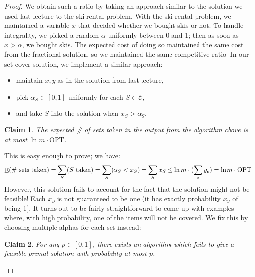 \documentclass[11pt]{article}
\DeclareMathOperator*{\E}{\mathbb{E}}
\let\Pr\relax
\DeclareMathOperator*{\Pr}{\mathbb{P}}
\newtheorem{claim}{Claim}[theorem]
\newcommand{\C}{\mathcal{C}}
\begin{document}
\begin{proof} We obtain such a ratio by taking an approach similar to the solution we used last lecture to the ski rental problem.  With the ski rental problem, we maintained a variable $x$ that decided whether we bought skis or not.  To handle integrality, we picked a random $\alpha$ uniformly between 0 and 1; then as soon as $x > \alpha$, we bought skis.  The expected cost of doing so maintained the same cost from the fractional solution, so we maintained the same competitive ratio.  In our set cover solution, we implement a similar approach:
\begin{itemize}
\setlength\itemsep{0cm}
\item maintain $x, y$ as in the solution from last lecture,
\item pick $\alpha_S \in [0, 1]$ uniformly for each $S \in \C$,
\item and take $S$ into the solution when $x_S > \alpha_S$.
\end{itemize}

\begin{framed}\begin{claim}
The expected \# of sets taken in the output from the algorithm above is at most $\ln m \cdot \text{OPT}$.
\end{claim}\end{framed}

This is easy enough to prove; we have:
$$\E(\# \text{ sets taken}) 
= \sum_S \Pr(S \text{ taken}) 
= \sum_S \Pr(\alpha_S < x_S) 
= \sum_S x_S \le \ln m \cdot (\sum_e y_e) 
= \ln m \cdot \text{OPT}$$
However, this solution fails to account for the fact that the solution might not be feasible!  Each $x_S$ is not guaranteed to be one (it has exactly probability $x_S$ of being 1).  It turns out to be fairly straightforward to come up with examples where, with high probability, one of the items will not be covered.  We fix this by choosing multiple alphas for each set instead:

\begin{framed}\begin{claim}
For any $p \in [0, 1]$, there exists an algorithm which fails to give a feasible primal solution with probability at most $p$.
\end{claim}\end{framed}


\end{proof}
\end{document}
